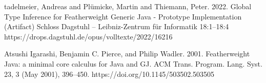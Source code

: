 tadelmeier, Andreas and Pl\"{u}micke, Martin and Thiemann, Peter. 2022. Global Type Inference for Featherweight Generic Java - Prototype Implementation (Artifact) Schloss Dagstuhl -- Leibniz-Zentrum f{\"u}r Informatik 18:1--18:4 https://drops.dagstuhl.de/opus/volltexte/2022/16216

Atsushi Igarashi, Benjamin C. Pierce, and Philip Wadler. 2001. Featherweight Java: a minimal core calculus for Java and GJ. ACM Trans. Program. Lang. Syst. 23, 3 (May 2001), 396–450. https://doi.org/10.1145/503502.503505
